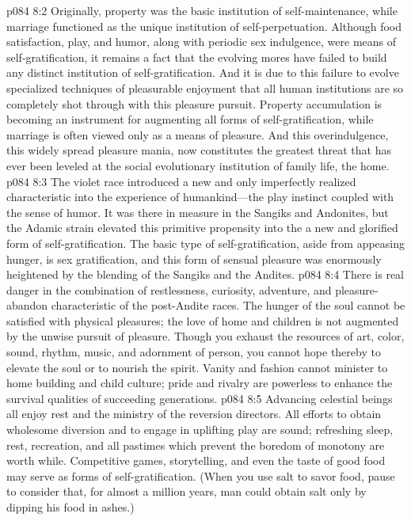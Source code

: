 \vs p084 8:2 Originally, property was the basic institution of self\hyp{}maintenance, while marriage functioned as the unique institution of self\hyp{}perpetuation. Although food satisfaction, play, and humor, along with periodic sex indulgence, were means of self\hyp{}gratification, it remains a fact that the evolving mores have failed to build any distinct institution of self\hyp{}gratification. And it is due to this failure to evolve specialized techniques of pleasurable enjoyment that all human institutions are so completely shot through with this pleasure pursuit. Property accumulation is becoming an instrument for augmenting all forms of self\hyp{}gratification, while marriage is often viewed only as a means of pleasure. And this overindulgence, this widely spread pleasure mania, now constitutes the greatest threat that has ever been leveled at the social evolutionary institution of family life, the home.
\vs p084 8:3 The violet race introduced a new and only imperfectly realized characteristic into the experience of humankind---the play instinct coupled with the sense of humor. It was there in measure in the Sangiks and Andonites, but the Adamic strain elevated this primitive propensity into the  a new and glorified form of self\hyp{}gratification. The basic type of self\hyp{}gratification, aside from appeasing hunger, is sex gratification, and this form of sensual pleasure was enormously heightened by the blending of the Sangiks and the Andites.
\vs p084 8:4 There is real danger in the combination of restlessness, curiosity, adventure, and pleasure\hyp{}abandon characteristic of the post\hyp{}Andite races. The hunger of the soul cannot be satisfied with physical pleasures; the love of home and children is not augmented by the unwise pursuit of pleasure. Though you exhaust the resources of art, color, sound, rhythm, music, and adornment of person, you cannot hope thereby to elevate the soul or to nourish the spirit. Vanity and fashion cannot minister to home building and child culture; pride and rivalry are powerless to enhance the survival qualities of succeeding generations.
\vs p084 8:5 Advancing celestial beings all enjoy rest and the ministry of the reversion directors. All efforts to obtain wholesome diversion and to engage in uplifting play are sound; refreshing sleep, rest, recreation, and all pastimes which prevent the boredom of monotony are worth while. Competitive games, storytelling, and even the taste of good food may serve as forms of self\hyp{}gratification. (When you use salt to savor food, pause to consider that, for almost a million years, man could obtain salt only by dipping his food in ashes.)
